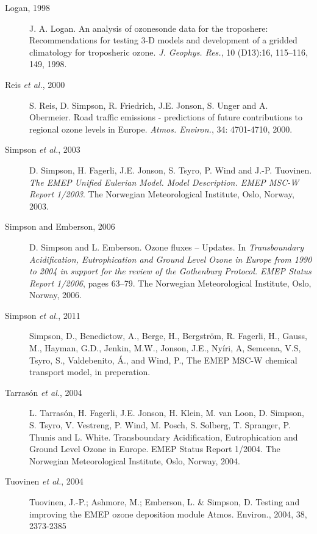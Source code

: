\begin{description}
\item[Logan, 1998] J. A. Logan. An analysis of ozonesonde data for the
  troposhere: Recommendations for testing 3-D models and development
  of a gridded climatology for troposheric ozone. {\it
    J. Geophys. Res.}, 10 (D13):16, 115--116, 149, 1998.


\item[Reis {\sl et al.}, 2000] S. Reis, D. Simpson, R. Friedrich,
  J.E. Jonson, S. Unger and A. Obermeier. Road traffic emissions -
  predictions of future  contributions to regional ozone levels in Europe.
{\it Atmos. Environ.}, 34: 4701-4710, 2000.

\item[Simpson {\sl et al.}, 2003] D. Simpson, H. Fagerli, J.E. Jonson, 
                    S. Tsyro, P. Wind and J.-P. Tuovinen.
{\it The EMEP Unified Eulerian Model. Model Description. EMEP MSC-W Report
1/2003}. The Norwegian
Meteorological Institute, Oslo, Norway, 2003.


\item[Simpson and Emberson, 2006] D. Simpson and L. Emberson. Ozone
  fluxes -- Updates.  
 In {\it Transboundary Acidification,
  Eutrophication  and Ground Level Ozone in Europe from 1990 to 2004
  in support for the review of the Gothenburg Protocol. EMEP Status
                   Report 1/2006}, pages 63--79. The Norwegian
Meteorological Institute, Oslo, Norway, 2006. 

\item[Simpson {\sl et al.}, 2011]
Simpson, D., Benedictow, A., Berge, H., Bergstr\"om, R.  Fagerli, H., Gauss, M., Hayman, G.D., Jenkin, M.W., Jonson, J.E., Ny\'iri, A, Semeena, V.S, Tsyro, S., Valdebenito, \'A., and Wind, P.,
The EMEP  MSC-W chemical transport model, in preperation.

\item[Tarras\'on {\sl et al.}, 2004] L. Tarras{\'o}n, H. Fagerli, 
              J.E. Jonson, H. Klein, M. van Loon,  
                   D. Simpson, S. Tsyro, V. Vestreng,
                   P. Wind, M. Posch, S. Solberg, T. Spranger,
                   P. Thunis and L. White. Transboundary
                   Acidification, Eutrophication 
                   and Ground Level Ozone in Europe. EMEP Status
                   Report 1/2004. The Norwegian
Meteorological Institute, Oslo, Norway, 2004. 

\item[Tuovinen {\sl et al.}, 2004] Tuovinen, J.-P.; Ashmore, M.; Emberson, L. \& Simpson, D. Testing and improving the EMEP ozone deposition module Atmos. Environ., 2004, 38, 2373-2385



\end{description}
